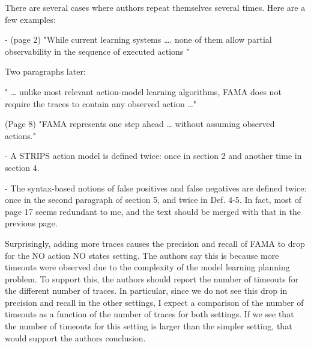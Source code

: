 \documentclass{article}
\begin{document}
\begin{mdframed}[hidealllines=true,backgroundcolor=gray!20]
  There are several cases where authors repeat themselves several times. Here are a few examples:

-          (page 2) "While current learning systems …. none of them allow partial observability in the sequence of executed actions "

Two paragraphs later:

" … unlike most relevant action-model learning algorithms, FAMA does not require the traces to contain any observed action …" 

(Page 8) "FAMA represents one step ahead … without assuming observed actions."

-          A STRIPS action model is defined twice: once in section 2 and another time in section 4.  

-          The syntax-based notions of false positives and false negatives are defined twice: once in the second paragraph of section 5, and twice in Def. 4-5. In fact, most of page 17 seems redundant to me, and the text should be merged with that in the previous page.
\end{mdframed}

\begin{mdframed}[hidealllines=true,backgroundcolor=gray!20]
  Surprisingly, adding more traces causes the precision and recall of FAMA to drop for the NO action NO states setting. The authors say this is because more timeouts were observed due to the complexity of the model learning planning problem. To support this, the authors should report the number of timeouts for the different number of traces. In particular, since we do not see this drop in precision and recall in the other settings, I expect a comparison of the number of timeouts as a function of the number of traces for both settings. If we see that the number of timeouts for this setting is larger than the simpler setting, that would support the authors conclusion.

\end{mdframed}
\end{document}
